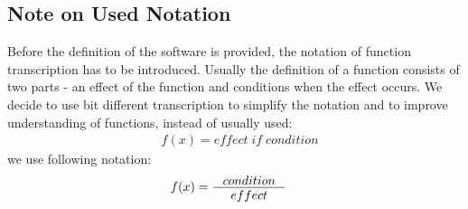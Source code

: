 \documentclass[11pt]{article}
\begin{document}
\subsection{Note on Used Notation}
Before the definition of the software is provided, the notation of function transcription has to be introduced. Usually the definition of a function consists of two parts - an effect of the function and conditions when the effect occurs. We decide to use bit different transcription to simplify the notation and to improve understanding of functions, instead of usually used:
\begin{align*}
& f(x) = effect \; if \; condition 
\end{align*}
we use following notation:
\begin{align*}
& f(x) =   \inference{condition}{effect}
\end{align*}
\end{document}

